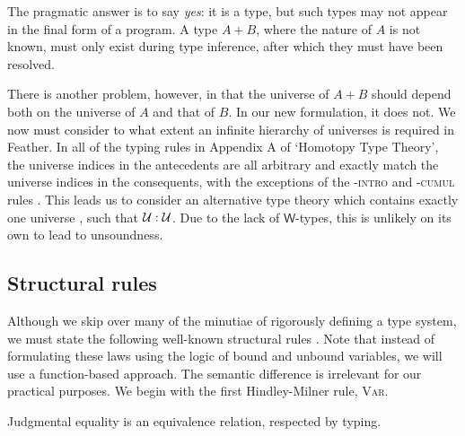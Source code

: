 \documentclass[UKenglish, 11pt, a4paper, parskip=half]{scrbook}
\begin{document}
The pragmatic answer is to say \textit{yes}: it is a type, but such types may not appear in the final form of a program.
A type \( A + B \), where the nature of \( A \) is not known, must only exist during type inference, after which they must have been resolved.

There is another problem, however, in that the universe of \( A + B \) should depend both on the universe of \( A \) and that of \( B \).
In our new formulation, it does not.
We now must consider to what extent an infinite hierarchy of universes is required in Feather.
In all of the typing rules in Appendix A of `Homotopy Type Theory', the universe indices in the antecedents are all arbitrary and exactly match the universe indices in the consequents, with the exceptions of the \UU-\textsc{intro} and \UU-\textsc{cumul} rules \cite{hottbook}.
This leads us to consider an alternative type theory which contains exactly one universe \UU{}, such that \( \UU : \UU \).
Due to the lack of \( \mathsf{W} \)-types, this is unlikely on its own to lead to unsoundness.

\subsection{Structural rules}

Although we skip over many of the minutiae of rigorously defining a type system, we must state the following well-known structural rules \cite{hottbook}.
Note that instead of formulating these laws using the logic of bound and unbound variables, we will use a function-based approach.
The semantic difference is irrelevant for our practical purposes.
We begin with the first Hindley-Milner rule, \textsc{Var}.

\begin{mathpar}
\end{mathpar}
Judgmental equality is an equivalence relation, respected by typing.
\end{document}
